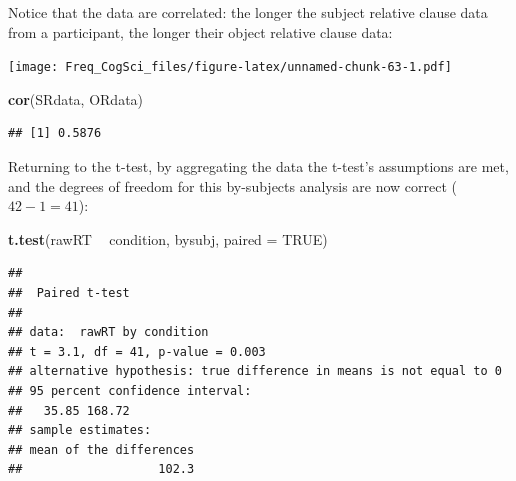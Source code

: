 \documentclass[12pt,]{krantz}
\newenvironment{Shaded}{\begin{snugshade}}{\end{snugshade}}
\newcommand{\DataTypeTok}[1]{\textcolor[rgb]{0.13,0.29,0.53}{#1}}
\newcommand{\KeywordTok}[1]{\textcolor[rgb]{0.13,0.29,0.53}{\textbf{#1}}}
\newcommand{\NormalTok}[1]{#1}
\newcommand{\OperatorTok}[1]{\textcolor[rgb]{0.81,0.36,0.00}{\textbf{#1}}}
\newcommand{\OtherTok}[1]{\textcolor[rgb]{0.56,0.35,0.01}{#1}}
\newcommand{\StringTok}[1]{\textcolor[rgb]{0.31,0.60,0.02}{#1}}
\begin{document}
Notice that the data are correlated: the longer the subject relative clause data from a participant, the longer their object relative clause data:

\begin{Shaded}
\end{Shaded}

\texttt{[image: Freq\_CogSci\_files/figure-latex/unnamed-chunk-63-1.pdf]}

\begin{Shaded}
\begin{Highlighting}[]
\KeywordTok{cor}\NormalTok{(SRdata, ORdata)}
\end{Highlighting}
\end{Shaded}

\begin{verbatim}
## [1] 0.5876
\end{verbatim}

Returning to the t-test, by aggregating the data the t-test's assumptions are met, and the degrees of freedom for this by-subjects analysis are now correct (\(42-1=41\)):

\begin{Shaded}
\begin{Highlighting}[]
\KeywordTok{t.test}\NormalTok{(rawRT }\OperatorTok{~}\StringTok{ }\NormalTok{condition, bysubj, }\DataTypeTok{paired =} \OtherTok{TRUE}\NormalTok{)}
\end{Highlighting}
\end{Shaded}

\begin{verbatim}
## 
## 	Paired t-test
## 
## data:  rawRT by condition
## t = 3.1, df = 41, p-value = 0.003
## alternative hypothesis: true difference in means is not equal to 0
## 95 percent confidence interval:
##   35.85 168.72
## sample estimates:
## mean of the differences 
##                   102.3
\end{verbatim}
\end{document}

